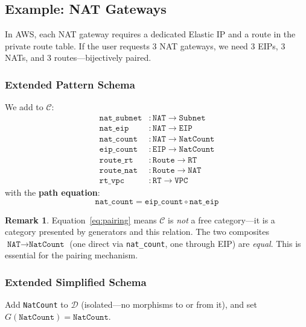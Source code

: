 \documentclass[11pt,a4paper]{article}
\theoremstyle{definition}
\newtheorem{remark}{Remark}[section]
\theoremstyle{plain}
\begin{document}
\subsection{Example: NAT Gateways}

In AWS, each NAT gateway requires a dedicated Elastic IP and a route in the private route table. If the user requests 3 NAT gateways, we need 3 EIPs, 3 NATs, and 3 routes---bijectively paired.

\subsubsection{Extended Pattern Schema}

We add to $\mathcal{C}$:
\begin{align*}
\texttt{nat\_subnet} &\colon \texttt{NAT} \to \texttt{Subnet} \\
\texttt{nat\_eip}    &\colon \texttt{NAT} \to \texttt{EIP} \\
\texttt{nat\_count}  &\colon \texttt{NAT} \to \texttt{NatCount} \\
\texttt{eip\_count}  &\colon \texttt{EIP} \to \texttt{NatCount} \\
\texttt{route\_rt}   &\colon \texttt{Route} \to \texttt{RT} \\
\texttt{route\_nat}  &\colon \texttt{Route} \to \texttt{NAT} \\
\texttt{rt\_vpc}     &\colon \texttt{RT} \to \texttt{VPC}
\end{align*}
with the \textbf{path equation}:
\begin{equation}
\label{eq:pairing}
\texttt{nat\_count} = \texttt{eip\_count} \circ \texttt{nat\_eip}
\end{equation}

\begin{remark}
Equation~\eqref{eq:pairing} means $\mathcal{C}$ is \emph{not} a free category---it is a category presented by generators and this relation. The two composites $\texttt{NAT} \to \texttt{NatCount}$ (one direct via \texttt{nat\_count}, one through EIP) are \emph{equal}. This is essential for the pairing mechanism.
\end{remark}

\subsubsection{Extended Simplified Schema}

Add \texttt{NatCount} to $\mathcal{D}$ (isolated---no morphisms to or from it), and set $G(\texttt{NatCount}) = \texttt{NatCount}$.
\end{document}

